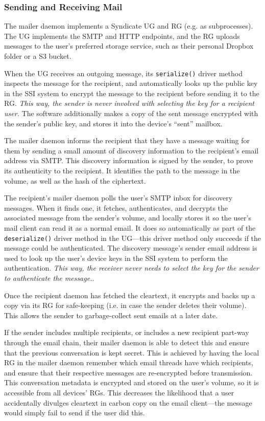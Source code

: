 \subsubsection{Sending and Receiving Mail}

The mailer daemon implements a Syndicate UG and RG (e.g. as subprocesses).
The UG implements the SMTP
and HTTP endpoints, and the RG uploads messages to the user's preferred storage
service, such as their personal Dropbox folder or a S3 bucket.

When the UG receives an outgoing message, its \texttt{serialize()} driver method inspects the
message for the recipient, and automatically looks up the public key in the SSI
system to encrypt the message to the recipient before sending it to the RG.
\emph{This way, the sender is never involved with selecting the key for a
recipient user.}  The software additionally makes a copy of the sent message encrypted with the
sender's public key, and stores it into the device's ``sent'' mailbox.

The mailer daemon informs the recipient that they have a message waiting for
them by sending a small amount of discovery information to the recipient's
email address via SMTP.  This discovery information is signed by the sender,
to prove its authenticity to the recipient.  It identifies the path to the
message in the volume, as well as the hash of the ciphertext.

The recipient's mailer daemon polls the user's SMTP inbox for discovery
messages.  When it finds one, it fetches, authenticates, and decrypts the
associated message from the sender's volume,
and locally stores it so the user's mail client can read it as a normal
email.  It does so automatically as part of the \texttt{deserialize()} driver
method in the UG---this driver method only succeeds if the message could be
authenticated.  The discovery message's sender email address
is used to look up the user's device keys in the SSI system to perform the authentication.
\emph{This way, the receiver never needs to select the key for the
sender to authenticate the message.}.

Once the recipient daemon has fetched the cleartext, it encrypts and backs up a
copy via its RG for safe-keeping (i.e. in case the sender deletes their volume).
This allows the sender to garbage-collect sent emails at a later date.

If the sender includes multiple recipients, or includes a new recipient part-way
through the email chain, their mailer daemon is able to detect this and ensure
that the previous conversation is kept secret.  This is achieved by having the
local RG in the mailer daemon remember which email threads have which
recipients, and ensure that their respective messages are re-encrypted before transmission.
This conversation metadata is encrypted and stored on the user's volume, so it
is accessible from all devices' RGs.  This decreases the likelihood that a user
accidentally divulges cleartext in carbon copy on the email client---the message
would simply fail to send if the user did this.

